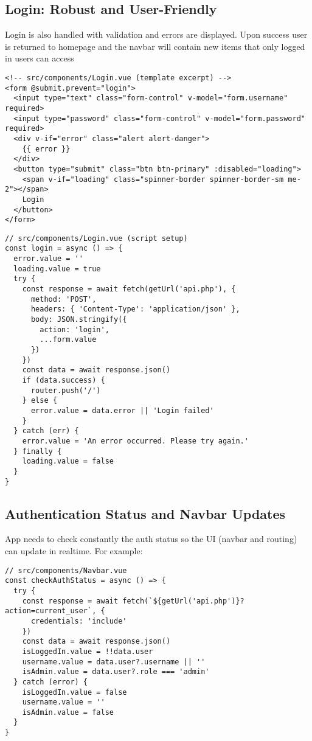 \documentclass[11pt,a4paper]{article}
\begin{document}
\subsection*{Login: Robust and User-Friendly}

Login is also handled with validation and errors are displayed. Upon success user is returned to homepage and the navbar will contain new items that only logged in users can access

\begin{verbatim}
<!-- src/components/Login.vue (template excerpt) -->
<form @submit.prevent="login">
  <input type="text" class="form-control" v-model="form.username" required>
  <input type="password" class="form-control" v-model="form.password" required>
  <div v-if="error" class="alert alert-danger">
    {{ error }}
  </div>
  <button type="submit" class="btn btn-primary" :disabled="loading">
    <span v-if="loading" class="spinner-border spinner-border-sm me-2"></span>
    Login
  </button>
</form>
\end{verbatim}

\begin{verbatim}
// src/components/Login.vue (script setup)
const login = async () => {
  error.value = ''
  loading.value = true
  try {
    const response = await fetch(getUrl('api.php'), {
      method: 'POST',
      headers: { 'Content-Type': 'application/json' },
      body: JSON.stringify({
        action: 'login',
        ...form.value
      })
    })
    const data = await response.json()
    if (data.success) {
      router.push('/')
    } else {
      error.value = data.error || 'Login failed'
    }
  } catch (err) {
    error.value = 'An error occurred. Please try again.'
  } finally {
    loading.value = false
  }
}
\end{verbatim}

\subsection*{Authentication Status and Navbar Updates}

App needs to check constantly the auth status so the UI (navbar and routing) can update in realtime. For example:

\begin{verbatim}
// src/components/Navbar.vue
const checkAuthStatus = async () => {
  try {
    const response = await fetch(`${getUrl('api.php')}?action=current_user`, {
      credentials: 'include'
    })
    const data = await response.json()
    isLoggedIn.value = !!data.user
    username.value = data.user?.username || ''
    isAdmin.value = data.user?.role === 'admin'
  } catch (error) {
    isLoggedIn.value = false
    username.value = ''
    isAdmin.value = false
  }
}
\end{verbatim}
\end{document}
